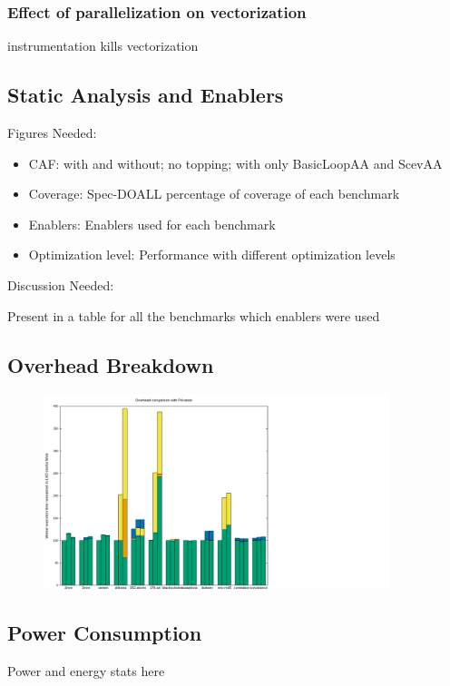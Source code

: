 \subsubsection{Effect of parallelization on vectorization}

instrumentation kills vectorization


\subsection{Static Analysis and Enablers}
Figures Needed:
\begin{itemize}
\item CAF: with and without; no topping; with only BasicLoopAA and ScevAA
\item Coverage: Spec-DOALL percentage of coverage of each benchmark
\item Enablers: Enablers used for each benchmark
\item Optimization level: Performance with different optimization levels
\end{itemize}

Discussion Needed:

Present in a table for all the benchmarks which enablers were used

\subsection{Overhead Breakdown}

\begin{figure}[htp]
  \includegraphics[width=0.9\textwidth]{figures/overheads}
\end{figure}

\subsection{Power Consumption}

Power and energy stats here

